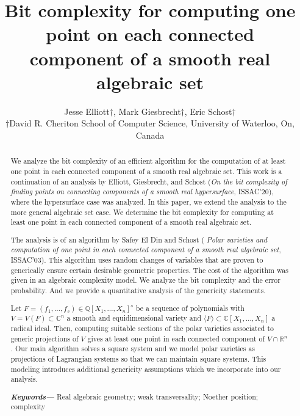 \documentclass[12pt]{article}
\title{Bit complexity for computing one point on each connected component of a smooth real algebraic set}
\author{Jesse Elliott$\dagger$, Mark Giesbrecht$\dagger$, Eric Schost$\dagger$  \\
        \small $\dagger$David R. Cheriton School of Computer Science, University of Waterloo, On, Canada \\
}
\date{} %
\def\C{\mathbb{C}}
\providecommand{\keywords}[1]
{
  \small	
  \textbf{\textit{Keywords---}} #1
}
\begin{document}
%
\maketitle
%
%
%
%
\begin{abstract}
We analyze the bit complexity of an efficient
  algorithm for the computation of at least one point in each
  connected component of a smooth real algebraic set. This work is a continuation of an analysis by Elliott, Giesbrecht, and Schost ({\em On the bit complexity of finding points on connecting components of a smooth real hypersurface}, ISSAC'20), where the hypersurface case was analyzed. In this paper, we extend the analysis to the more general algebraic set case. We determine the bit complexity for computing at least one point in each connected component of a smooth real algebraic set.  
    
    The analysis is of an algorithm by Safey El Din and Schost ({\em
    Polar varieties and computation of one point in each connected
    component of a smooth real algebraic set}, ISSAC'03). This
  algorithm uses random changes of variables that are proven to
  generically ensure certain desirable geometric properties. The
  cost of the algorithm was given in an algebraic complexity
  model. We analyze the bit complexity and the error probability. And we provide a
  quantitative analysis of the genericity statements. 
  
  Let $F=(f_1,\hdots, f_s) \in \mathbb{Q}[X_1, \hdots , X_n]^s$ be a sequence of polynomials with $V = V(F) \subset \C^n$ a smooth and equidimensional variety and $\langle F \rangle \subset  \C[X_1, \hdots , X_n]$ a radical ideal. Then, computing suitable sections of the
polar varieties associated to generic projections of $V$
gives at least one point in each connected component of
$V \cap \mathbb{R}^n$. Our main algorithm solves a square system and we model polar varieties as projections of Lagrangian systems so that we can maintain square systems. This modeling introduces additional genericity assumptions which we incorporate into our analysis.   

\keywords{Real algebraic geometry; weak transversality; Noether position; complexity}
\end{abstract}
%
%
%



\end{document}
